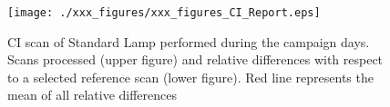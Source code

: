 \begin{figure}[hbtp!]
\begin{center}   
\texttt{[image: ./xxx\_figures/xxx\_figures\_CI\_Report.eps]}
           \caption{CI scan of Standard Lamp performed during the campaign days. Scans processed (upper figure) and relative differences with respect to a selected reference scan (lower figure). Red line represents the mean of all relative differences}
	         \label{fig:CIreport}
\end{center}
\end{figure}
